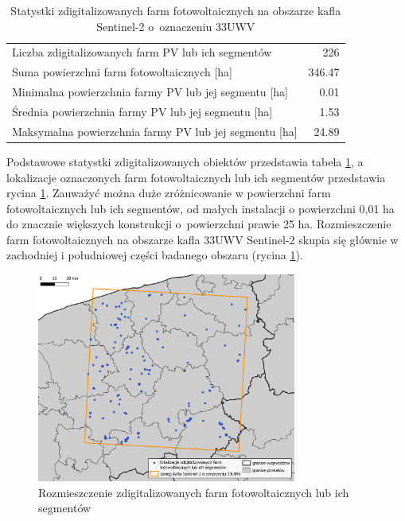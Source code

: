 \documentclass{amuthesis}
\begin{document}
\hypertarget{tbl-tabela-digitizing-results}{}
\begin{table}
\caption{\label{tbl-tabela-digitizing-results}Statystki zdigitalizowanych farm fotowoltaicznych na obszarze kafla
Sentinel-2 o~oznaczeniu 33UWV }\tabularnewline

\centering
\begin{tabular}{lr}
\toprule
Liczba zdigitalizowanych farm PV lub ich segmentów & 226\\
Suma powierzchni farm fotowoltaicznych [ha] & 346.47\\
Minimalna powierzchnia farmy PV lub jej segmentu [ha] & 0.01\\
Średnia powierzchnia farmy PV lub jej segmentu [ha] & 1.53\\
Maksymalna powierzchnia farmy PV lub jej segmentu [ha] & 24.89\\
\bottomrule
\end{tabular}
\end{table}

Podstawowe statystki zdigitalizowanych obiektów przedstawia tabela
\ref{tbl-tabela-digitizing-results}, a lokalizacje oznaczonych farm
fotowoltaicznych lub ich segmentów przedstawia rycina
\ref{fig-rycina-spatial-distribution-pv}. Zauważyć można duże
zróżnicowanie w powierzchni farm fotowoltaicznych lub ich segmentów, od
małych instalacji o powierzchni 0,01 ha do znacznie większych
konstrukcji o~powierzchni prawie 25 ha. Rozmieszczenie farm
fotowoltaicznych na obszarze kafla 33UWV Sentinel-2 skupia się głównie w
zachodniej i południowej części badanego obszaru (rycina
\ref{fig-rycina-spatial-distribution-pv}).

\begin{figure}[H]

{\centering \includegraphics[width=0.76\textwidth,height=\textheight]{figures/farmy2.png}

}

\caption{\label{fig-rycina-spatial-distribution-pv}Rozmieszczenie
zdigitalizowanych farm fotowoltaicznych lub ich segmentów}

\end{figure}
\end{document}
